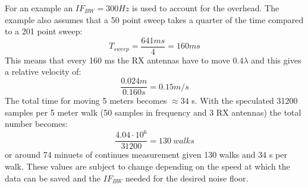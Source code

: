 For an example an $IF_{BW} = 300Hz$ is used to account for the overhead. The example also assumes that a 50 point sweep takes a quarter of the time compared to a 201 point sweep:
\begin{equation}
T_{sweep} = \frac{641 ms}{4} = 160ms
\end{equation}
This means that every 160 ms the RX antennas have to move $0.4 \lambda$ and this gives a relative velocity of:
\begin{equation}
\frac{0.024m}{0.160s} = 0.15 m/s
\end{equation}
The total time for moving 5 meters becomes $\approx 34$ s. With the speculated 31200 samples per 5 meter walk (50 samples in frequency and 3 RX antennas) the total number becomes:
\begin{equation}
\frac{4.04 \cdot 10^6}{31200} = 130 \ walks
\end{equation}
or around 74 minuets of continues measurement given 130 walks and 34 s per walk. These values are subject to change depending on the speed at which the data can be saved and the $IF_{BW}$ needed for the desired noise floor.
